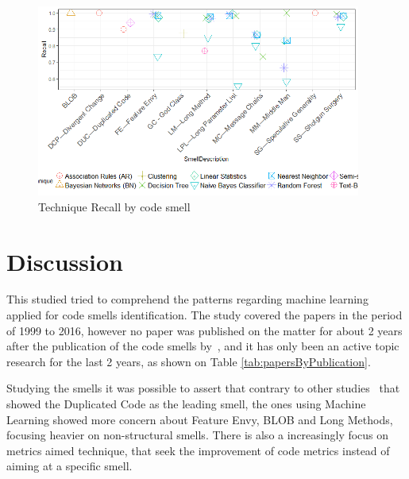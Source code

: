 \begin{figure}[!ht] 
    \centering
	\caption{Technique Recall by code smell}
	\label{fig:techniqueXSmellRecall}
	\includegraphics[width=0.95\textwidth]{imagens/TechniqueXSmellRecall.png}
\end{figure}


\section{Discussion}
\label{sec:discussion}

This studied tried to comprehend the patterns regarding machine learning applied for code smells identification. The study covered the papers in the period of 1999 to 2016, however no paper was published on the matter for about 2 years after the publication of the code smells by~\cite{fowler1999refactoring}, and it has only been an active topic research for the last 2 years, as shown on Table \ref{tab:papersByPublication}.

Studying the smells it was possible to assert that contrary to other studies~\citep{fowler1999refactoring, rasool2015review, fernandes2016review} that showed the Duplicated Code as the leading  smell, the ones using Machine Learning showed more concern about Feature Envy, BLOB and Long Methods, focusing heavier on non-structural smells. There is also a increasingly focus on metrics aimed technique, that seek the improvement of code metrics instead of aiming at a specific smell.

